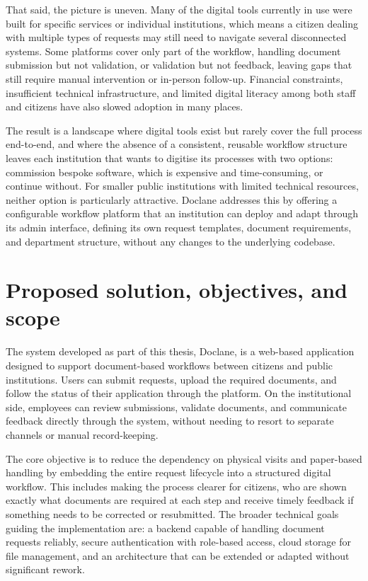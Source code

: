 \par That said, the picture is uneven. Many of the digital tools currently in use were built for specific services or individual institutions, which means a citizen dealing with multiple types of requests may still need to navigate several disconnected systems. Some platforms cover only part of the workflow, handling document submission but not validation, or validation but not feedback, leaving gaps that still require manual intervention or in-person follow-up. Financial constraints, insufficient technical infrastructure, and limited digital literacy among both staff and citizens have also slowed adoption in many places.

\par The result is a landscape where digital tools exist but rarely cover the full process end-to-end, and where the absence of a consistent, reusable workflow structure leaves each institution that wants to digitise its processes with two options: commission bespoke software, which is expensive and time-consuming, or continue without. For smaller public institutions with limited technical resources, neither option is particularly attractive. Doclane addresses this by offering a configurable workflow platform that an institution can deploy and adapt through its admin interface, defining its own request templates, document requirements, and department structure, without any changes to the underlying codebase.

\section{Proposed solution, objectives, and scope}

\par The system developed as part of this thesis, Doclane, is a web-based application designed to support document-based workflows between citizens and public institutions. Users can submit requests, upload the required documents, and follow the status of their application through the platform. On the institutional side, employees can review submissions, validate documents, and communicate feedback directly through the system, without needing to resort to separate channels or manual record-keeping.

\par The core objective is to reduce the dependency on physical visits and paper-based handling by embedding the entire request lifecycle into a structured digital workflow. This includes making the process clearer for citizens, who are shown exactly what documents are required at each step and receive timely feedback if something needs to be corrected or resubmitted. The broader technical goals guiding the implementation are: a backend capable of handling document requests reliably, secure authentication with role-based access, cloud storage for file management, and an architecture that can be extended or adapted without significant rework.

